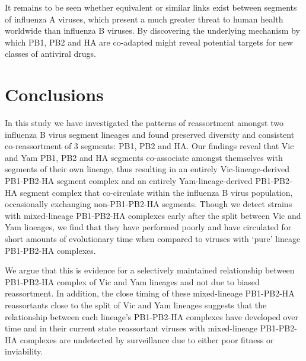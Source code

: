 \documentclass[11pt,oneside,letterpaper]{article}
\begin{document}
It remains to be seen whether equivalent or similar links exist between segments of influenza A viruses, which present a much greater threat to human health worldwide than influenza B viruses.
By discovering the underlying mechanism by which PB1, PB2 and HA are co-adapted might reveal potential targets for new classes of antiviral drugs.

\section*{Conclusions}
In this study we have investigated the patterns of reassortment amongst two influenza B virus segment lineages and found preserved diversity and consistent co-reassortment of 3 segments: PB1, PB2 and HA.
Our findings reveal that Vic and Yam PB1, PB2 and HA segments co-associate amongst themselves with segments of their own lineage, thus resulting in an entirely Vic-lineage-derived PB1-PB2-HA segment complex and an entirely Yam-lineage-derived PB1-PB2-HA segment complex that co-circulate within the influenza B virus population, occasionally exchanging non-PB1-PB2-HA segments.
Though we detect strains with mixed-lineage PB1-PB2-HA complexes early after the split between Vic and Yam lineages, we find that they have performed poorly and have circulated for short amounts of evolutionary time when compared to viruses with `pure' lineage PB1-PB2-HA complexes.

We argue that this is evidence for a selectively maintained relationship between PB1-PB2-HA complex of Vic and Yam lineages and not due to biased reassortment.
In addition, the close timing of these mixed-lineage PB1-PB2-HA reassortants close to the split of Vic and Yam lineages suggests that the relationship between each lineage's PB1-PB2-HA complexes have developed over time and in their current state reassortant viruses with mixed-lineage PB1-PB2-HA complexes are undetected by surveillance due to either poor fitness or inviability.







\end{document}

